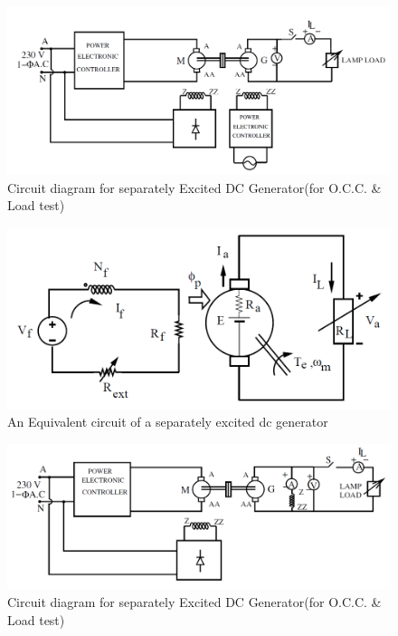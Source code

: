 \documentclass[12pt]{article}
\begin{document}
                 \begin{figure}[H]
                 
                    \centering
                    \includegraphics[width = 0.8\linewidth]{LAB-3/sep_ex_gen_circuit.PNG}
                    \caption{Circuit diagram for separately Excited DC Generator(for O.C.C. \& Load test)}
                    \label{fig:my_label}
                 \end{figure}
                 \begin{figure}[H]
                    \centering
                    \includegraphics[width = 0.8\linewidth]{LAB-3/sep_equv_cir.PNG}
                    \caption{An Equivalent circuit of a separately excited dc generator}
                    \label{fig:my_label}
                \end{figure}
                \begin{figure}[H]
                    \centering
                    \includegraphics[width = 0.9\linewidth]{LAB-3/shunt_gen_circuit.PNG}
                    \caption{Circuit diagram for separately Excited DC Generator(for O.C.C. \& Load test)}
                    \label{fig:my_label}
                \end{figure}
\end{document}
